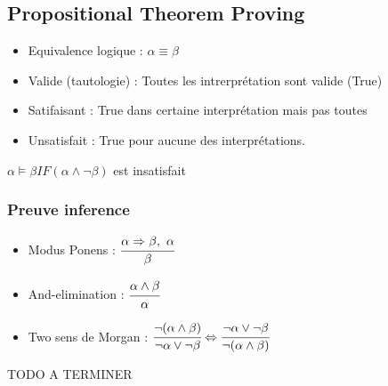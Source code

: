 	\subsection{Propositional Theorem Proving}
		\begin{itemize}
			\item Equivalence logique : $\alpha \equiv \beta$
			\item Valide (tautologie) : Toutes les intrerprétation sont valide (True)
			\item Satifaisant : True dans certaine interprétation mais pas toutes
			\item Unsatisfait : True pour aucune des interprétations.
			
		\end{itemize}
		
		$\alpha \models \beta IF (\alpha \wedge \neg\beta)$ est insatisfait
			
		\subsubsection{Preuve inference}
			\begin{itemize}
				\item Modus Ponens : $\cfrac{\alpha \Rightarrow \beta, \ \alpha}{\beta}$
				\item And-elimination : $\cfrac{\alpha \wedge \beta}{\alpha}$
				\item Two sens de Morgan : $\cfrac{\neg(\alpha\wedge\beta)}{\neg \alpha \vee \neg \beta} \Leftrightarrow \cfrac{\neg \alpha\vee\neg\beta}{\neg (\alpha \wedge\beta)}$

			\end{itemize}
			
		TODO A TERMINER
		